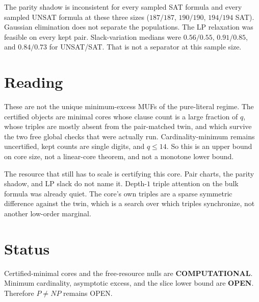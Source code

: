 \documentclass[11pt]{article}
\begin{document}
The parity shadow is inconsistent for every sampled SAT formula and every sampled UNSAT formula at these three sizes (\(187/187\), \(190/190\), \(194/194\) SAT). Gaussian elimination does not separate the populations. The LP relaxation was feasible on every kept pair. Slack-variation medians were \(0.56/0.55\), \(0.91/0.85\), and \(0.84/0.73\) for UNSAT/SAT. That is not a separator at this sample size.

\section{Reading}
These are not the unique minimum-excess MUFs of the pure-literal regime. The certified objects are minimal cores whose clause count is a large fraction of \(q\), whose triples are mostly absent from the pair-matched twin, and which survive the two free global checks that were actually run. Cardinality-minimum remains uncertified, kept counts are single digits, and \(q\le 14\). So this is an upper bound on core size, not a linear-core theorem, and not a monotone lower bound.

The resource that still has to scale is certifying this core. Pair charts, the parity shadow, and LP slack do not name it. Depth-\(1\) triple attention on the bulk formula was already quiet. The core's own triples are a sparse symmetric difference against the twin, which is a search over which triples synchronize, not another low-order marginal.

\section{Status}
Certified-minimal cores and the free-resource nulls are \textbf{COMPUTATIONAL}. Minimum cardinality, asymptotic excess, and the slice lower bound are \textbf{OPEN}. Therefore \(P\ne NP\) remains OPEN.
\end{document}
